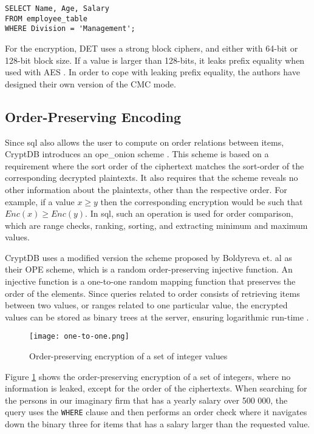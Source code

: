 \begin{verbatim}
SELECT Name, Age, Salary
FROM employee_table
WHERE Division = 'Management';
\end{verbatim}

For the encryption, DET uses a strong block ciphers, and either with 64-bit or 128-bit block size. If a value is larger than 128-bits, it leaks  prefix equality when used with AES \citep{CryptDB_Main_Paper}. In order to cope with leaking prefix equality, the authors have designed their own version of the CMC mode.



\subsection{Order-Preserving Encoding}
\label{sec:ope}

Since \Gls{sql} also allows the user to compute on order relations between items, CryptDB introduces an \Gls{ope_onion} scheme \citep{CryptDB_Main_Paper}. This scheme is based on a requirement where the sort order of the ciphertext matches the sort-order of the corresponding decrypted plaintexts. It also requires that the scheme reveals no other information about the plaintexts, other than the respective order. For example, if a value $x \ge y$ then the corresponding encryption would be such that $Enc(x) \ge Enc(y)$. In \Gls{sql}, such an operation is used for order comparison, which are range checks, ranking, sorting, and extracting minimum and maximum values. 

CryptDB uses a modified version the scheme proposed by Boldyreva et. al \citep{ope_cryptdb} as their OPE scheme, which is a random order-preserving injective function. An injective function is a one-to-one random mapping function that preserves the order of the elements. Since queries related to order consists of retrieving items between two values, or ranges related to one particular value, the encrypted values can be stored as binary trees at the server, ensuring logarithmic run-time \cite{ope_cryptdb}.



\begin{figure}[h]
	\texttt{[image: one-to-one.png]}
	\caption{Order-preserving encryption of a set of integer values}
	\label{fig:ope_function}
\end{figure}

Figure \ref{fig:ope_function} shows the order-preserving encryption of a set of integers, where no information is leaked, except for the order of the ciphertexts. When searching for the persons in our imaginary firm that has a yearly salary over 500 000, the query uses the \verb!WHERE! clause and then performs an order check where it navigates down the binary three for items that has a salary larger than the requested value.

